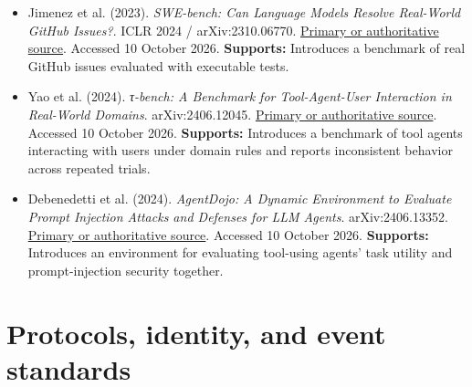 \begin{itemize}
\item {}\textbf{} Jimenez et al. (2023). \emph{SWE-bench: Can Language Models Resolve Real-World GitHub Issues?}. ICLR 2024 / arXiv:2310.06770. \href{\detokenize{https://arxiv.org/abs/2310.06770}}{Primary or authoritative source}. Accessed 10 October 2026. \textbf{Supports:} Introduces a benchmark of real GitHub issues evaluated with executable tests.

\item {}\textbf{} Yao et al. (2024). \emph{τ-bench: A Benchmark for Tool-Agent-User Interaction in Real-World Domains}. arXiv:2406.12045. \href{\detokenize{https://arxiv.org/abs/2406.12045}}{Primary or authoritative source}. Accessed 10 October 2026. \textbf{Supports:} Introduces a benchmark of tool agents interacting with users under domain rules and reports inconsistent behavior across repeated trials.

\item {}\textbf{} Debenedetti et al. (2024). \emph{AgentDojo: A Dynamic Environment to Evaluate Prompt Injection Attacks and Defenses for LLM Agents}. arXiv:2406.13352. \href{\detokenize{https://arxiv.org/abs/2406.13352}}{Primary or authoritative source}. Accessed 10 October 2026. \textbf{Supports:} Introduces an environment for evaluating tool-using agents' task utility and prompt-injection security together.

\end{itemize}

\section{Protocols, identity, and event standards}

